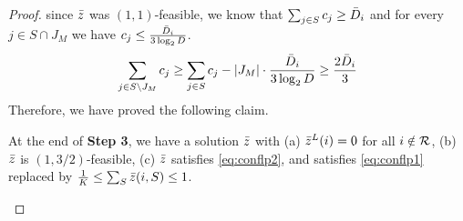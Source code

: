 \begin{proof}
since $\bar z$ was $(1,1)$-feasible, we know that $\sum_{j\in S} c_j \geq \bar{D}_i$ and for every $j\in S\cap J_M$ we have $c_j \leq \frac{\bar{D}_i}{3\log_2 D}$.
\[
\sum_{j\in S\setminus J_M} c_j \geq  \sum_{j\in S} c_j - |J_M|\cdot \frac{\bar{D}_i}{3\log_2 D} \geq \frac{2\bar{D}_i}{3}
\]
Therefore, we have proved the following claim.
\begin{claim}\label{clm:007}
At the end of {\bf  Step 3}, we have a solution $\bar z$ with (a) $\bar z^L(i) = 0$ for all $i\notin {\cal R}$, (b) $\bar z$ is $(1,3/2)$-feasible,
(c) $\bar z$ satisfies \eqref{eq:conflp2}, and satisfies \eqref{eq:conflp1} replaced by $\frac{1}{K} \leq \sum_S \bar z(i,S) \leq 1$.
%
%	
\end{claim}
\smallskip


\end{proof}
